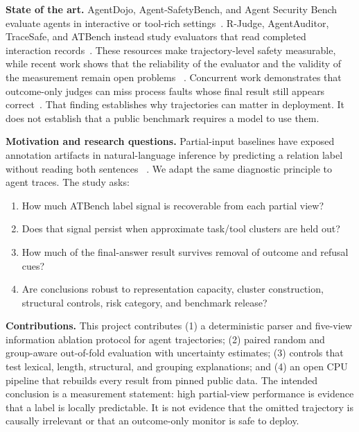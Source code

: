 \documentclass[10pt,twocolumn,twoside]{article}
\begin{document}
\textbf{State of the art.}
AgentDojo, Agent-SafetyBench, and Agent Security Bench evaluate agents in interactive
or tool-rich settings~\cite{agentdojo,agentsafetybench,asb}. R-Judge, AgentAuditor,
TraceSafe, and ATBench instead study evaluators that read completed interaction
records~\cite{rjudge,agentauditor,tracesafe,atbench}. These resources make
trajectory-level safety measurable, while recent work shows that the reliability of
the evaluator and the validity of the measurement remain open problems
~\cite{jailjudge,policyinvariance,safetycapability}. Concurrent work demonstrates
that outcome-only judges can miss process faults whose final result still appears
correct~\cite{trajectoryjudge}. That finding establishes why trajectories can
matter in deployment. It does not establish that a public benchmark requires a
model to use them.

\textbf{Motivation and research questions.}
Partial-input baselines have exposed annotation artifacts in natural-language
inference by predicting a relation label without reading both sentences
~\cite{gururangan,poliak}. We adapt the same diagnostic principle to agent traces.
The study asks:

\begin{enumerate}[label=\textbf{RQ\arabic*:}]
    \item How much ATBench label signal is recoverable from each partial view?
    \item Does that signal persist when approximate task/tool clusters are held out?
    \item How much of the final-answer result survives removal of outcome and refusal cues?
    \item Are conclusions robust to representation capacity, cluster construction,
    structural controls, risk category, and benchmark release?
\end{enumerate}

\textbf{Contributions.}
This project contributes (1) a deterministic parser and five-view information
ablation protocol for agent trajectories; (2) paired random and group-aware
out-of-fold evaluation with uncertainty estimates; (3) controls that test lexical,
length, structural, and grouping explanations; and (4) an open CPU pipeline that
rebuilds every result from pinned public data. The intended conclusion is a
measurement statement: high partial-view performance is evidence that a label is
locally predictable. It is not evidence that the omitted trajectory is causally
irrelevant or that an outcome-only monitor is safe to deploy.
\end{document}
